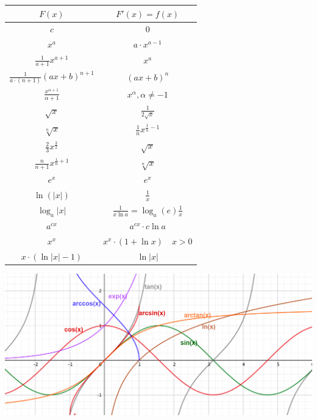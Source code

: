 \renewcommand\arraystretch{1.6}
\begin{center}
    \begin{tabular}{c|c}
        $F(x)$ & $F'(x) = f(x)$ \\
        \hline
            
        $ c $ & $ 0 $ \\
	    $ x^a $ & $ a \cdot x^{a - 1} $ \\
        $ \frac{1}{a+1} x^{a+1} $ & $ x^a $ \\
        $ \frac{1}{a\cdot(n+1)} (ax+b)^{n+1} $ & $ (ax+b)^n $ \\
	    $ \frac{x^{\alpha+1}}{\alpha + 1} $ & $ x^\alpha, \alpha \neq -1 $ \\
        $ \sqrt x $ & $ \frac{1}{2 \sqrt x} $ \\
        $ \sqrt[n] x $ & $ \frac{1}{n} {x}^{ \frac{1}{n} -1 } $ \\
        $ \frac{2}{3} x^{ \frac{3}{2} } $ & $ \sqrt x $ \\
        $ \frac{n}{n+1} x^{ \frac{1}{n}+1 } $ & $ \sqrt[n] x $ \\
	    $ e^x $ & $ e^x $ \\
	    $ \ln(|x|) $ & $ \frac{1}{x} $ \\
        $ \log_a |x| $  &  $ \frac{1}{x \ln a} = \log_a(e) \frac{1}{x} $ \\
        $ a^{cx} $ & $ a^{cx} \cdot c \ln a $ \\
        $ x^x $ & $ x^x \cdot (1+\ln x) \quad \scriptstyle x > 0 $ \\
        $ x \cdot (\ln |x| - 1) $  &  $ \ln |x| $ \\
    \end{tabular}
\end{center}
\renewcommand{\arraystretch}{1}



\begin{center}
	\includegraphics[width=\linewidth]{assets/funktionen.png}
\end{center}
